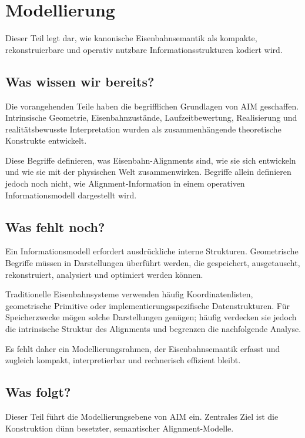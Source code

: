 \chapter*{Modellierung}
{}

Dieser Teil legt dar, wie kanonische Eisenbahnsemantik als kompakte,
rekonstruierbare und operativ nutzbare Informationsstrukturen kodiert wird.

\section*{Was wissen wir bereits?}

Die vorangehenden Teile haben die begrifflichen Grundlagen von AIM geschaffen.
Intrinsische Geometrie, Eisenbahnzustände, Laufzeitbewertung, Realisierung und
realitätsbewusste Interpretation wurden als zusammenhängende theoretische
Konstrukte entwickelt.

Diese Begriffe definieren, was Eisenbahn-Alignments sind, wie sie sich
entwickeln und wie sie mit der physischen Welt zusammenwirken. Begriffe allein
definieren jedoch noch nicht, wie Alignment-Information in einem operativen
Informationsmodell dargestellt wird.

\section*{Was fehlt noch?}

Ein Informationsmodell erfordert ausdrückliche interne Strukturen.
Geometrische Begriffe müssen in Darstellungen überführt werden, die gespeichert,
ausgetauscht, rekonstruiert, analysiert und optimiert werden können.

Traditionelle Eisenbahnsysteme verwenden häufig Koordinatenlisten,
geometrische Primitive oder implementierungsspezifische Datenstrukturen. Für
Speicherzwecke mögen solche Darstellungen genügen; häufig verdecken sie jedoch
die intrinsische Struktur des Alignments und begrenzen die nachfolgende
Analyse.

Es fehlt daher ein Modellierungsrahmen, der Eisenbahnsemantik erfasst und
zugleich kompakt, interpretierbar und rechnerisch effizient bleibt.

\section*{Was folgt?}

Dieser Teil führt die Modellierungsebene von AIM ein. Zentrales Ziel ist die
Konstruktion dünn besetzter, semantischer Alignment-Modelle.

